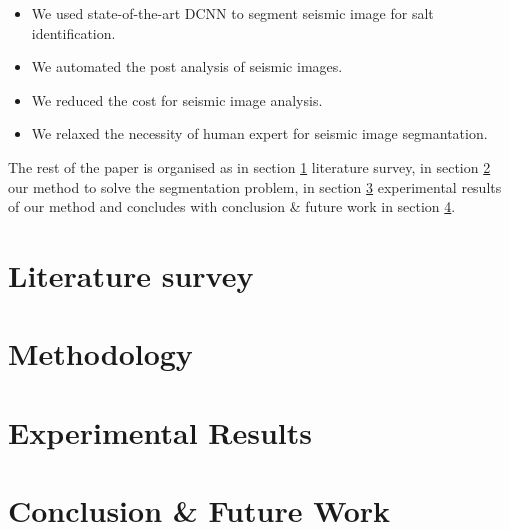 \documentclass[conference]{IEEEtran}
\begin{document}
\begin{itemize}
	\item We used state-of-the-art DCNN to segment seismic image for salt identification.
	\item We automated the post analysis of seismic images.
	\item We reduced the cost for seismic image analysis.
	\item We relaxed the necessity of human expert for seismic image segmantation.
\end{itemize}

The rest of the paper is organised as in section \ref{Literature survey} literature survey, in section \ref{Methodology} our method to solve the segmentation problem, in section \ref{Experimental Results} experimental results of our method and concludes with conclusion \& future work in section \ref{Conclusion Future Work}.

\section{Literature survey}\label{Literature survey}
\section{Methodology}\label{Methodology}
\section{Experimental Results}\label{Experimental Results}
\section{Conclusion \& Future Work}\label{Conclusion Future Work}











\end{document}
